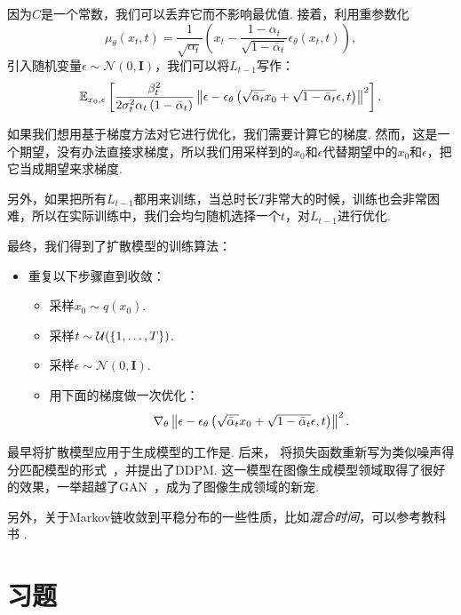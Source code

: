 因为$C$是一个常数，我们可以丢弃它而不影响最优值. 接着，利用重参数化
\[
\mu_{\theta}(x_t, t) =  \frac{1}{\sqrt{\alpha_t}} \left( x_t - \frac{1-\alpha_t}{\sqrt{1 - \bar{\alpha}_t}}\epsilon_{\theta}(x_t, t) \right),
\]
引入随机变量$\epsilon\sim\mathcal{N}(0,\mathbf{I})$，我们可以将$L_{t-1}$写作：
\[
\mathbb{E}_{x_0, \epsilon}\left[\frac{\beta_t^2}{2 \sigma_t^2 \alpha_t\left(1-\bar{\alpha}_t\right)}\left\|\epsilon-\epsilon_\theta\left(\sqrt{\bar{\alpha}_t} x_0+\sqrt{1-\bar{\alpha}_t} \epsilon, t\right)\right\|^2\right].
\]

如果我们想用基于梯度方法对它进行优化，我们需要计算它的梯度. 然而，这是一个期望，没有办法直接求梯度，所以我们用采样到的$x_0$和$\epsilon$代替期望中的$x_0$和$\epsilon$，把它当成期望来求梯度. 

另外，如果把所有$L_{t-1}$都用来训练，当总时长$T$非常大的时候，训练也会非常困难，所以在实际训练中，我们会均匀随机选择一个$t$，对$L_{t-1}$进行优化. 

最终，我们得到了扩散模型的训练算法：

\begin{itemize}
    \item 重复以下步骤直到收敛：
    \begin{itemize}
        \item 采样$x_0 \sim q\left(x_0\right)$.
        \item 采样$t \sim \mathcal{U}(\{1, \ldots, T\})$.
        \item 采样$\epsilon \sim \mathcal{N}(0, \mathbf{I})$.
        \item 用下面的梯度做一次优化：
        \[
        \nabla_\theta\left\|\epsilon-\epsilon_\theta\left(\sqrt{\bar{\alpha}_t} x_0+\sqrt{1-\bar{\alpha}_t} \epsilon, t\right)\right\|^2.
        \]
    \end{itemize}
\end{itemize}

\begin{remark}
    最早将扩散模型应用于生成模型的工作是\cite{sohl-dicksteinDeepUnsupervisedLearning2015}. 后来，\cite{hoDenoisingDiffusionProbabilistic2020} 将损失函数重新写为类似噪声得分匹配模型的形式~\cite{songGenerativeModelingEstimating2019}，并提出了DDPM. 这一模型在图像生成模型领域取得了很好的效果，一举超越了GAN~\cite{goodfellowGenerativeAdversarialNets2014}，成为了图像生成领域的新宠. 
    
    另外，关于Markov链收敛到平稳分布的一些性质，比如\textit{混合时间}，可以参考教科书 \cite{levinMarkovChainsMixing2008}.
\end{remark}

\section{习题}

